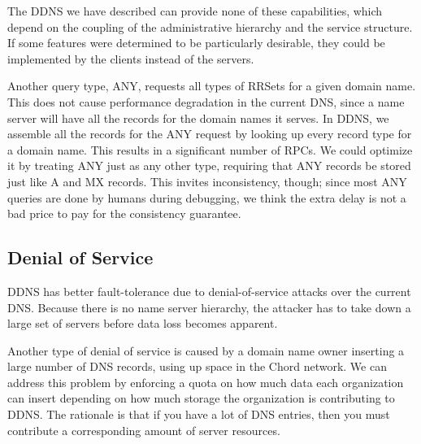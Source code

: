 The DDNS we have described
can provide none of these capabilities, which depend
on the coupling of the administrative hierarchy and the service
structure.
If some features were determined to be particularly desirable,
they could be implemented by the clients instead of the servers.

Another query type, ANY, requests all types of RRSets for
a given domain name. This does not cause performance 
degradation in the current DNS, since a name server
will have all the records for the domain names it serves.
In DDNS, we assemble all the records for the ANY 
request by looking up every record type for a domain 
name.
This results in a significant number of RPCs. 
We could optimize it by treating ANY just as any other type,
requiring that ANY records be stored just like A and MX records.
This invites inconsistency, though; since most ANY queries are
done by humans during debugging, we think the extra
delay is not a bad price to pay for the consistency guarantee.

\subsection{Denial of Service}

DDNS has better fault-tolerance due to denial-of-service attacks 
over the current DNS. 
Because there is no name server hierarchy, the 
attacker has to take down a large
set of servers before data loss becomes apparent.

Another type of denial of service is caused by 
a domain name owner inserting a large number 
of DNS records, using up space in the Chord network.
We can address this problem 
by enforcing a quota on how much data each organization
can insert depending on how much storage the organization
is contributing to DDNS. The rationale is that if you
have a lot of DNS entries, then you must contribute a 
corresponding amount of server resources.

